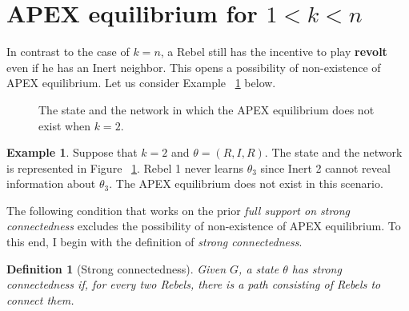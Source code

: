 \documentclass[12pt,letter]{article}
\newtheorem{definition}{Definition}[section]
\theoremstyle{definition}
\newtheorem{example}{Example}
\theoremstyle{remark}
\theoremstyle{claim}
\begin{document}
\section{APEX equilibrium for $1<k<n$}
\label{sec:equilibrium_2}

In contrast to the case of $k=n$, a Rebel still has the incentive to play \textbf{revolt} even if he has an Inert neighbor. This opens a possibility of non-existence of APEX equilibrium. Let us consider Example ~\ref{ex_strong_connectedness} below.

\begin{figure}
\caption{The state and the network in which the APEX equilibrium does not exist when $k=2$.}


\begin{center}
\end{center}

\label{fig:strong_connectedness}

\end{figure}

\begin{example}\label{ex_strong_connectedness}
Suppose that $k=2$ and $\theta=(R,I,R)$. The state and the network is represented in Figure ~\ref{fig:strong_connectedness}. Rebel 1 never learns $\theta_3$ since Inert 2 cannot reveal information about $\theta_3$. The APEX equilibrium does not exist in this scenario.
\end{example}

The following condition that works on the prior \textit{full support on strong connectedness} excludes the possibility of non-existence of APEX equilibrium. To this end, I begin with the definition of \textit{strong connectedness}.

\begin{definition}[Strong connectedness]
Given $G$, a state $\theta$ has strong connectedness if, for every two Rebels, there is a path consisting of Rebels to connect them.

\end{definition}  
\end{document}
